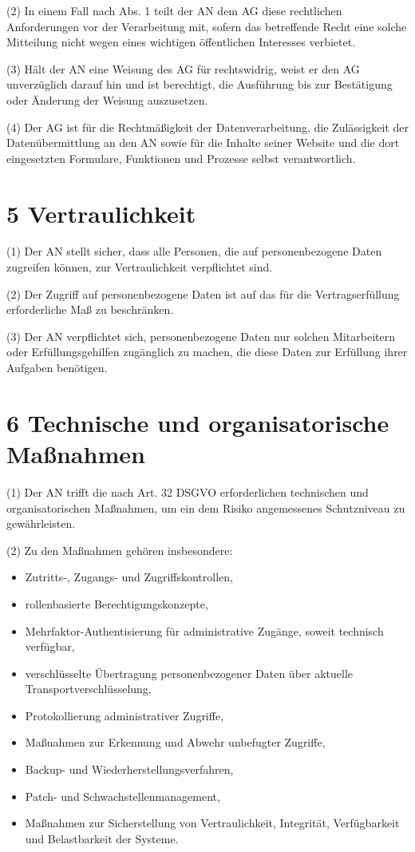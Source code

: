 \documentclass[11pt,a4paper]{article}
\begin{document}
(2) In einem Fall nach Abs. 1 teilt der AN dem AG diese rechtlichen Anforderungen vor der Verarbeitung mit, sofern das betreffende Recht eine solche Mitteilung nicht wegen eines wichtigen öffentlichen Interesses verbietet.

(3) Hält der AN eine Weisung des AG für rechtswidrig, weist er den AG unverzüglich darauf hin und ist berechtigt, die Ausführung bis zur Bestätigung oder Änderung der Weisung auszusetzen.

(4) Der AG ist für die Rechtmäßigkeit der Datenverarbeitung, die Zulässigkeit der Datenübermittlung an den AN sowie für die Inhalte seiner Website und die dort eingesetzten Formulare, Funktionen und Prozesse selbst verantwortlich.

\section*{5 Vertraulichkeit}
(1) Der AN stellt sicher, dass alle Personen, die auf personenbezogene Daten zugreifen können, zur Vertraulichkeit verpflichtet sind.

(2) Der Zugriff auf personenbezogene Daten ist auf das für die Vertragserfüllung erforderliche Maß zu beschränken.

(3) Der AN verpflichtet sich, personenbezogene Daten nur solchen Mitarbeitern oder Erfüllungsgehilfen zugänglich zu machen, die diese Daten zur Erfüllung ihrer Aufgaben benötigen.

\section*{6 Technische und organisatorische Maßnahmen}
(1) Der AN trifft die nach Art. 32 DSGVO erforderlichen technischen und organisatorischen Maßnahmen, um ein dem Risiko angemessenes Schutzniveau zu gewährleisten.

(2) Zu den Maßnahmen gehören insbesondere:
\begin{itemize}
  \item Zutritts-, Zugangs- und Zugriffskontrollen,
  \item rollenbasierte Berechtigungskonzepte,
  \item Mehrfaktor-Authentisierung für administrative Zugänge, soweit technisch verfügbar,
  \item verschlüsselte Übertragung personenbezogener Daten über aktuelle Transportverschlüsselung,
  \item Protokollierung administrativer Zugriffe,
  \item Maßnahmen zur Erkennung und Abwehr unbefugter Zugriffe,
  \item Backup- und Wiederherstellungsverfahren,
  \item Patch- und Schwachstellenmanagement,
  \item Maßnahmen zur Sicherstellung von Vertraulichkeit, Integrität, Verfügbarkeit und Belastbarkeit der Systeme.
\end{itemize}
\end{document}
